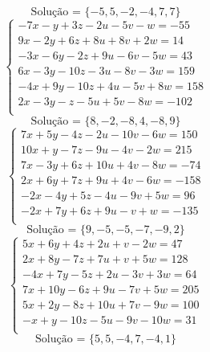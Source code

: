 \documentclass[12pt,oneside,a4paper]{article}
\begin{document}
\begin{equation*}
\text{Solução = }\{-5,5,-2,-4,7,7\}
\end{equation*}
\vspace{\baselineskip}
\begin{equation*}
\begin{cases}
-7x-y+3z-2u-5v-w=-55 \\
9x-2y+6z+8u+8v+2w=14 \\
-3x-6y-2z+9u-6v-5w=43 \\
6x-3y-10z-3u-8v-3w=159 \\
-4x+9y-10z+4u-5v+8w=158 \\
2x-3y-z-5u+5v-8w=-102 \\
\end{cases}
\end{equation*}
\begin{equation*}
\text{Solução = }\{8,-2,-8,4,-8,9\}
\end{equation*}
\vspace{\baselineskip}
\begin{equation*}
\begin{cases}
7x+5y-4z-2u-10v-6w=150 \\
10x+y-7z-9u-4v-2w=215 \\
7x-3y+6z+10u+4v-8w=-74 \\
2x+6y+7z+9u+4v-6w=-158 \\
-2x-4y+5z-4u-9v+5w=96 \\
-2x+7y+6z+9u-v+w=-135 \\
\end{cases}
\end{equation*}
\begin{equation*}
\text{Solução = }\{9,-5,-5,-7,-9,2\}
\end{equation*}
\vspace{\baselineskip}
\begin{equation*}
\begin{cases}
5x+6y+4z+2u+v-2w=47 \\
2x+8y-7z+7u+v+5w=128 \\
-4x+7y-5z+2u-3v+3w=64 \\
7x+10y-6z+9u-7v+5w=205 \\
5x+2y-8z+10u+7v-9w=100 \\
-x+y-10z-5u-9v-10w=31 \\
\end{cases}
\end{equation*}
\begin{equation*}
\text{Solução = }\{5,5,-4,7,-4,1\}
\end{equation*}
\end{document}
